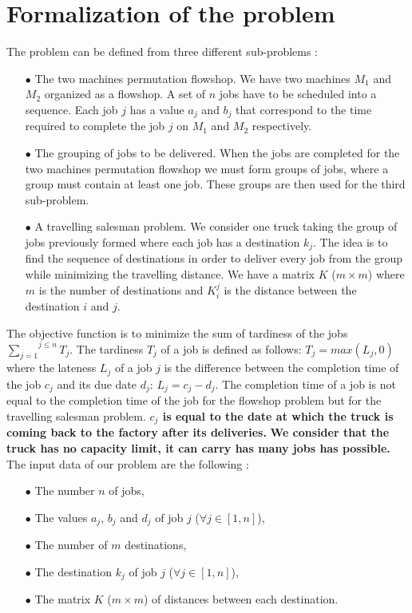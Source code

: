 \documentclass[UTF8, twoside]{EPURapport}
\begin{document}
\chapter{Formalization of the problem}

	The problem can be defined from three different sub-problems :
	
\begin{itemize}
\item[$\bullet$] The two machines permutation flowshop. We have two machines $M_1$ and $M_2$ organized as a flowshop. A set of $n$ jobs have to be scheduled into a sequence. Each job $j$ has a value $a_j$ and $b_j$ that correspond to the time required to complete the job $j$ on $M_1$ and $M_2$ respectively.
\item[$\bullet$] The grouping of jobs to be delivered. When the jobs are completed for the two machines permutation flowshop we must form groups of jobs, where a group must contain at least one job. These groups are then used for the third sub-problem.
\item[$\bullet$] A travelling salesman problem. We consider one truck taking the group of jobs previously formed where each job has a destination $k_j$. The idea is to find the sequence of destinations in order to deliver every job from the group while minimizing the travelling distance. We have a matrix $K$ ($m \times m$) where $m$ is the number of destinations and $K_i^j$ is the distance between the destination $i$ and $j$.
\end{itemize}

	The objective function is to minimize the sum of tardiness of the jobs $\overset{j \leq n}{\underset{j=1}{\sum}} T_j$. The tardiness $T_j$ of a job is defined as follows: $T_j = max(L_j, 0)$ where the lateness $L_j$  of a job $j$ is the difference between the completion time of the job $c_j$ and its due date $d_j$: $L_j = c_j - d_j$. The completion time of a job is not equal to the completion time of the job for the flowshop problem but for the travelling salesman problem. \textbf{$c_j$ is equal to the date at which the truck is coming back to the factory after its deliveries.}
\textbf{We consider that the truck has no capacity limit, it can carry has many jobs has possible.}
\\

	The input data of our problem are the following :
\begin{itemize}
\item[$\bullet$] The number $n$ of jobs,
\item[$\bullet$] The values $a_j$, $b_j$ and $d_j$ of job $j$ ($\forall j \in [1,n]$),
\item[$\bullet$] The number of $m$ destinations,
\item[$\bullet$] The destination $k_j$ of job $j$ ($\forall j \in [1,n]$),
\item[$\bullet$] The matrix $K$ ($m \times m$) of distances between each destination.\\
\end{itemize}
\end{document}
